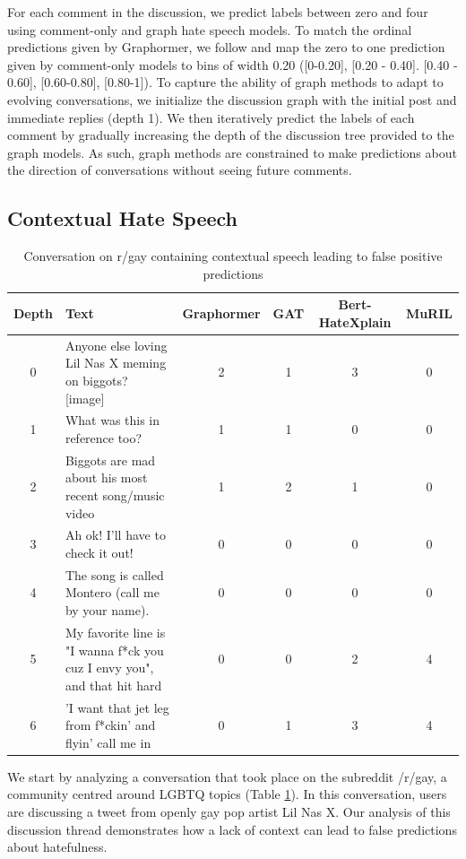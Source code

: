 \documentclass[letterpaper]{article} %
\begin{document}
For each comment in the discussion, we predict labels between zero and four using comment-only and graph hate speech models. To match the ordinal predictions given by Graphormer, we follow \citet{hebert2022predicting} and map the zero to one prediction given by comment-only models to bins of width 0.20 ([0-0.20], [0.20 - 0.40]. [0.40 - 0.60], [0.60-0.80], [0.80-1]). To capture the ability of graph methods to adapt to evolving conversations, we initialize the discussion graph with the initial post and immediate replies (depth 1). We then iteratively predict the labels of each comment by gradually increasing the depth of the discussion tree provided to the graph models. As such, graph methods are constrained to make predictions about the direction of conversations without seeing future comments.

\subsection{Contextual Hate Speech}
\begin{table}
\centering
\caption{Conversation on r/gay containing contextual speech leading to false positive predictions}
\begin{tabular}{c|p{8cm}|c|c|c|c}
Depth & Text & Graphormer & GAT & Bert-HateXplain & MuRIL \\
\hline
\hline
0 & Anyone else loving Lil Nas X meming on biggots? [image] & 2 & 1 & 3 & 0 \\
\hline
1 & What was this in reference too? & 1 & 1 & 0 & 0  \\
\hline
2 & Biggots are mad about his most recent song/music video & 1 & 2 & 1 & 0  \\
\hline
3 & Ah ok! I'll have to check it out! & 0 & 0 & 0 & 0 \\
\hline
4 & The song is called Montero (call me by your name). & 0 & 0 & 0 & 0 \\
\hline
5 & My favorite line is "I wanna f*ck you cuz I envy you", and that hit hard & 0 & 0 & 2 & 4 \\
\hline
6 & 'I want that jet leg from f*ckin' and flyin' call me in & 0 & 1 & 3 & 4 \\
\end{tabular}
\label{tab:contextual-gay}
\end{table}
We start by analyzing a conversation that took place on the subreddit /r/gay, a community centred around LGBTQ topics (Table \ref{tab:contextual-gay}). In this conversation, users are discussing a tweet from openly gay pop artist Lil Nas X. Our analysis of this discussion thread demonstrates how a lack of context can lead to false predictions about hatefulness.
\end{document}
